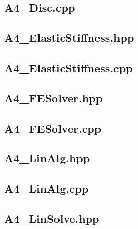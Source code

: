 \documentclass[a4paper, 12pt]{article}
\begin{document}
\newpage
\subsection{A4\_Disc.cpp} \label{subsec:Disc.cpp}


\newpage
\subsection{A4\_ElasticStiffness.hpp} \label{subsec:ElasticStiffness.hpp}


\newpage
\subsection{A4\_ElasticStiffness.cpp} \label{subsec:ElasticStiffness.cpp}


\newpage
\subsection{A4\_FESolver.hpp} \label{subsec:FESolver.hpp}


\newpage
\subsection{A4\_FESolver.cpp} \label{subsec:FESolver.cpp}


\newpage
\subsection{A4\_LinAlg.hpp} \label{subsec:LinAlg.hpp}


\newpage
\subsection{A4\_LinAlg.cpp} \label{subsec:LinAlg.cpp}


\newpage
\subsection{A4\_LinSolve.hpp} \label{subsec:LinSolve.hpp}

\end{document}
